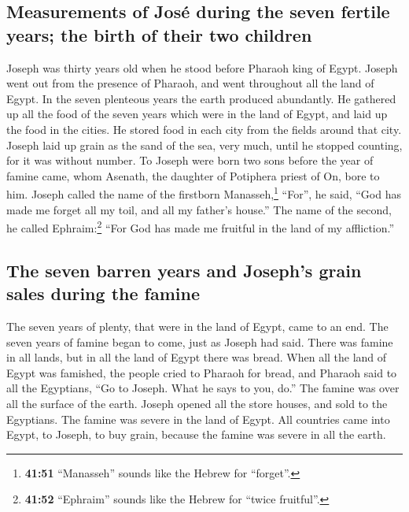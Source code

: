 \begin{paracol}{2}
\begin{otherlanguage}{english}
\hypertarget{measurements-of-josuxe9-during-the-seven-fertile-years-the-birth-of-their-two-children}{%
\subsection{Measurements of José during the seven fertile years; the
birth of their two
children}\label{measurements-of-josuxe9-during-the-seven-fertile-years-the-birth-of-their-two-children}}

 Joseph was thirty years old when he stood before Pharaoh
king of Egypt. Joseph went out from the presence of Pharaoh, and went
throughout all the land of Egypt.  In the seven plenteous
years the earth produced abundantly.  He gathered up all
the food of the seven years which were in the land of Egypt, and laid up
the food in the cities. He stored food in each city from the fields
around that city.  Joseph laid up grain as the sand of
the sea, very much, until he stopped counting, for it was without
number.  To Joseph were born two sons before the year of
famine came, whom Asenath, the daughter of Potiphera priest of On, bore
to him.  Joseph called the name of the firstborn
Manasseh,\footnote{\textbf{41:51} ``Manasseh'' sounds like the Hebrew
  for ``forget''.} ``For'', he said, ``God has made me forget all my
toil, and all my father's house.''  The name of the
second, he called Ephraim:\footnote{\textbf{41:52} ``Ephraim'' sounds
  like the Hebrew for ``twice fruitful''.} ``For God has made me
fruitful in the land of my affliction.''

\hypertarget{the-seven-barren-years-and-josephs-grain-sales-during-the-famine}{%
\subsection{The seven barren years and Joseph's grain sales during the
famine}\label{the-seven-barren-years-and-josephs-grain-sales-during-the-famine}}

 The seven years of plenty, that were in the land of
Egypt, came to an end.  The seven years of famine began
to come, just as Joseph had said. There was famine in all lands, but in
all the land of Egypt there was bread.  When all the land
of Egypt was famished, the people cried to Pharaoh for bread, and
Pharaoh said to all the Egyptians, ``Go to Joseph. What he says to you,
do.''  The famine was over all the surface of the earth.
Joseph opened all the store houses, and sold to the Egyptians. The
famine was severe in the land of Egypt.  All countries
came into Egypt, to Joseph, to buy grain, because the famine was severe
in all the earth.


\end{otherlanguage}
\end{paracol}
